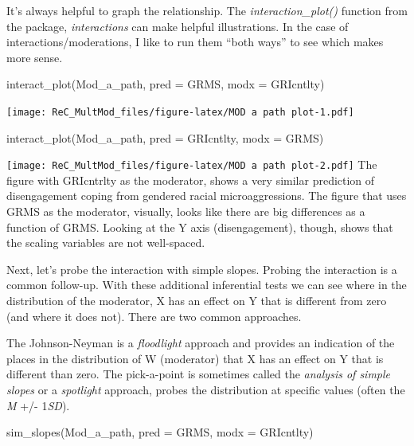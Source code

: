 \documentclass[
  english,
]{book}
\newenvironment{Shaded}{\begin{snugshade}}{\end{snugshade}}
\newcommand{\AttributeTok}[1]{\textcolor[rgb]{0.77,0.63,0.00}{#1}}
\newcommand{\FunctionTok}[1]{\textcolor[rgb]{0.00,0.00,0.00}{#1}}
\newcommand{\NormalTok}[1]{#1}
\begin{document}
It's always helpful to graph the relationship. The \emph{interaction\_plot()} function from the package, \emph{interactions} can make helpful illustrations. In the case of interactions/moderations, I like to run them ``both ways'' to see which makes more sense.

\begin{Shaded}
\begin{Highlighting}[]
\FunctionTok{interact\_plot}\NormalTok{(Mod\_a\_path, }\AttributeTok{pred =}\NormalTok{ GRMS, }\AttributeTok{modx =}\NormalTok{ GRIcntlty)}
\end{Highlighting}
\end{Shaded}

\texttt{[image: ReC\_MultMod\_files/figure-latex/MOD a path plot-1.pdf]}

\begin{Shaded}
\begin{Highlighting}[]
\FunctionTok{interact\_plot}\NormalTok{(Mod\_a\_path, }\AttributeTok{pred =}\NormalTok{ GRIcntlty, }\AttributeTok{modx =}\NormalTok{ GRMS)}
\end{Highlighting}
\end{Shaded}

\texttt{[image: ReC\_MultMod\_files/figure-latex/MOD a path plot-2.pdf]}
The figure with GRIcntrlty as the moderator, shows a very similar prediction of disengagement coping from gendered racial microaggressions. The figure that uses GRMS as the moderator, visually, looks like there are big differences as a function of GRMS. Looking at the Y axis (disengagement), though, shows that the scaling variables are not well-spaced.

Next, let's probe the interaction with simple slopes. Probing the interaction is a common follow-up. With these additional inferential tests we can see where in the distribution of the moderator, X has an effect on Y that is different from zero (and where it does not). There are two common approaches.

The Johnson-Neyman is a \emph{floodlight} approach and provides an indication of the places in the distribution of W (moderator) that X has an effect on Y that is different than zero. The pick-a-point is sometimes called the \emph{analysis of simple slopes} or a \emph{spotlight} approach, probes the distribution at specific values (often the \emph{M} +/- 1\emph{SD}).

\begin{Shaded}
\begin{Highlighting}[]
\FunctionTok{sim\_slopes}\NormalTok{(Mod\_a\_path, }\AttributeTok{pred =}\NormalTok{ GRMS, }\AttributeTok{modx =}\NormalTok{ GRIcntlty)}
\end{Highlighting}
\end{Shaded}
\end{document}

